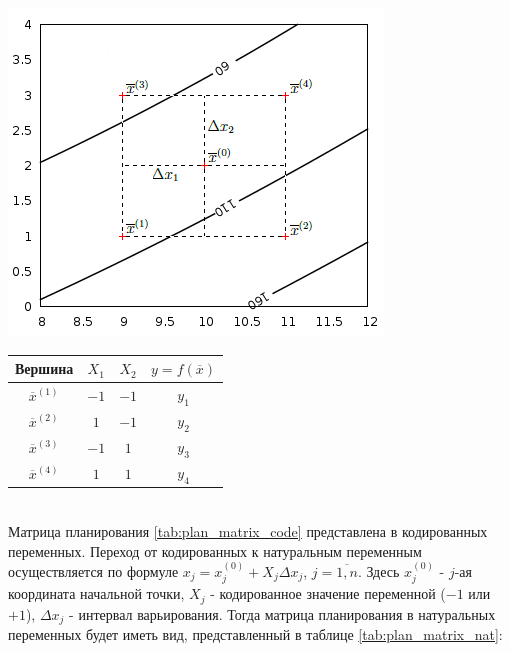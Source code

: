 \documentclass[a4paper,12pt]{report}
\begin{document}
\begin{minipage}{\textwidth}
  \begin{minipage}{0.49\textwidth}
    \centering
    \includegraphics[width=0.9\linewidth]{plan_exp.png}
    \label{fig:plan_exp}
  \end{minipage}
  \hfill
  \begin{minipage}{0.49\textwidth}
    \centering
    \captionsetup{justification=raggedleft}
    \label{tab:plan_matrix_code}
    \begin{tabular}{|c|c|c|c|}
      \hline
      Вершина & $X_{1}$ & $X_{2}$ & $y = f(\overline{x})$\\
      \hline
      $\overline{x}^{(1)}$ & $-1$ & $-1$ & $y_{1}$\\
      \hline
      $\overline{x}^{(2)}$ & $1$ & $-1$ & $y_{2}$\\
      \hline
      $\overline{x}^{(3)}$ & $-1$ & $1$ & $y_{3}$\\
      \hline
      $\overline{x}^{(4)}$ & $1$ & $1$ & $y_{4}$\\
      \hline
    \end{tabular}
  \end{minipage}
\end{minipage}
\\

Матрица планирования \ref{tab:plan_matrix_code} представлена в кодированных переменных. Переход от кодированных к натуральным переменным осуществляется по формуле $x_{j} = x^{(0)}_{j} + X_{j}\Delta x_{j}$, $j=\overline{1,n}$. Здесь $x^{(0)}_{j}$ - $j$-ая координата начальной точки, $X_{j}$ - кодированное значение переменной ($-1$ или $+1$), $\Delta x_{j}$ - интервал варьирования. Тогда матрица планирования в натуральных переменных будет иметь вид, представленный в таблице \ref{tab:plan_matrix_nat}:
\end{document}
